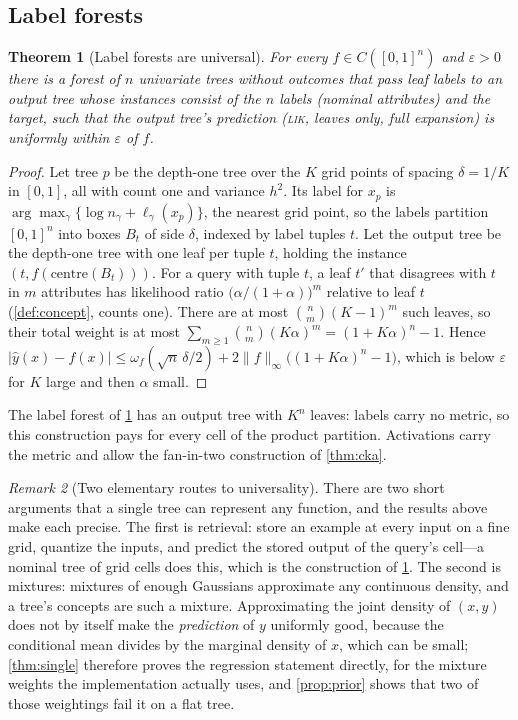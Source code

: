 \documentclass[11pt]{article}
\newtheorem{theorem}{Theorem}
\theoremstyle{definition}
\theoremstyle{remark}
\newtheorem{remark}[theorem]{Remark}
\newcommand{\hy}{\hat{y}}
\begin{document}
\subsection{Label forests}

\begin{theorem}[Label forests are universal]\label{thm:label}
For every $f\in C([0,1]^n)$ and $\varepsilon>0$ there is a forest of $n$ univariate trees
without outcomes that pass leaf labels to an output tree whose instances consist of the
$n$ labels (nominal attributes) and the target, such that the output tree's prediction
(\textsc{lik}, leaves only, full expansion) is uniformly within $\varepsilon$ of $f$.
\end{theorem}
\begin{proof}
Let tree $p$ be the depth-one tree over the $K$ grid points of spacing $\delta=1/K$ in
$[0,1]$, all with count one and variance $h^2$.  Its label for $x_p$ is
$\arg\max_\gamma\{\log n_\gamma+\ell_\gamma(x_p)\}$, the nearest grid point, so the
labels partition $[0,1]^n$ into boxes $B_t$ of side $\delta$, indexed by label tuples
$t$.  Let the output tree be the depth-one tree with one leaf per tuple $t$, holding the
instance $(t,f(\text{centre}(B_t)))$.  For a query with tuple $t$, a leaf $t'$ that
disagrees with $t$ in $m$ attributes has likelihood ratio $\bigl(\alpha/(1+\alpha)\bigr)^m$
relative to leaf $t$ (\cref{def:concept}, counts one).  There are at most
$\binom nm(K-1)^m$ such leaves, so their total weight is at most
$\sum_{m\ge1}\binom nm(K\alpha)^m=(1+K\alpha)^n-1$.  Hence
$|\hy(x)-f(x)|\le\omega_f(\sqrt n\,\delta/2)+2\|f\|_\infty\bigl((1+K\alpha)^n-1\bigr)$,
which is below $\varepsilon$ for $K$ large and then $\alpha$ small.
\end{proof}

The label forest of \cref{thm:label} has an output tree with $K^n$ leaves: labels carry
no metric, so this construction pays for every cell of the product partition.
Activations carry the metric and allow the fan-in-two construction of \cref{thm:cka}.

\begin{remark}[Two elementary routes to universality]\label{rem:routes}
There are two short arguments that a single tree can represent any function, and the
results above make each precise.  The first is retrieval: store an example at every
input on a fine grid, quantize the inputs, and predict the stored output of the query's
cell---a nominal tree of grid cells does this, which is the construction of
\cref{thm:label}.  The second is mixtures: mixtures of enough Gaussians approximate any
continuous density, and a tree's concepts are such a mixture.  Approximating the joint
density of $(x,y)$ does not by itself make the \emph{prediction} of $y$ uniformly good,
because the conditional mean divides by the marginal density of $x$, which can be small;
\cref{thm:single} therefore proves the regression statement directly, for the mixture
weights the implementation actually uses, and \cref{prop:prior} shows that two of those
weightings fail it on a flat tree.
\end{remark}
\end{document}
